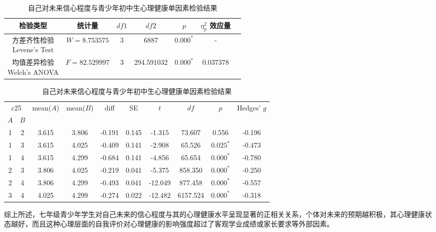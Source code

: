 \documentclass[zihao = -4, linespread = 1.5]{article}
\begin{document}
\begin{table}[htbp]
    \centering
    \setlength{\tabcolsep}{8pt}
    \renewcommand{\arraystretch}{1.2}
    \caption{自己对未来信心程度与青少年初中生心理健康单因素检验结果}\label{table-anova-sconfidence-health}
    \begin{tabular}{ccccccc}
        \bottomrule[1.5pt]
        检验类型 & 统计量 & $df1$ & $df2$ & $p$ & $\eta^2_p$ 效应量 \\
        \midrule[0.75pt]
        \makecell{方差齐性检验 \\ Levene's Test} & $W=8.753575$ & 3 & 6887 & $\bm{0.000^{*}}$ & - \\
        \midrule[0.75pt]
        \makecell{均值差异检验 \\ Welch's ANOVA} & $F=82.529997$ & 3 & 294.591032 & $\bm{0.000^{*}}$ & 0.037378 \\
    \end{tabular}
    \setlength{\tabcolsep}{6pt}
    \renewcommand{\arraystretch}{1.2}
    \begin{tabular}{cccccccccc}
        \bottomrule[1.5pt]
        \multicolumn{2}{c}{c25} & \multirow{2}{*}{mean($A$)} & \multirow{2}{*}{mean($B$)} & \multirow{2}{*}{diff} & \multirow{2}{*}{SE} & \multirow{2}{*}{$t$} & \multirow{2}{*}{$df$} & \multirow{2}{*}{$p$} & \multirow{2}{*}{Hedges' $g$} \\
        \cmidrule[0.75pt](lr){1-2}
        $A$ & $B$ \\
        \midrule[0.75pt]
        1 & 2 & 3.615 & 3.806 & -0.191 & 0.145 & -1.315 & 73.607 & 0.556 & -0.196 \\
        1 & 3 & 3.615 & 4.025 & -0.409 & 0.141 & -2.908 & 65.526 & $\bm{0.025^{*}}$ & -0.473 \\
        1 & 4 & 3.615 & 4.299 & -0.684 & 0.141 & -4.856 & 65.654 & $\bm{0.000^{*}}$ & -0.780 \\
        2 & 3 & 3.806 & 4.025 & -0.219 & 0.041 & -5.375 & 858.350 & $\bm{0.000^{*}}$ & -0.250 \\
        2 & 4 & 3.806 & 4.299 & -0.493 & 0.041 & -12.049 & 877.458 & $\bm{0.000^{*}}$ & -0.557 \\
        3 & 4 & 4.025 & 4.299 & -0.274 & 0.022 & -12.482 & 6157.524 & $\bm{0.000^{*}}$ & -0.318 \\
        \toprule[1.5pt]
    \end{tabular}
\end{table}

综上所述，七年级青少年学生对自己未来的信心程度与其的心理健康水平呈现显著的正相关关系，个体对未来的预期越积极，其心理健康状态越好，而且这种心理层面的自我评价对心理健康的影响强度超过了客观学业成绩或家长要求等外部因素。
\end{document}

